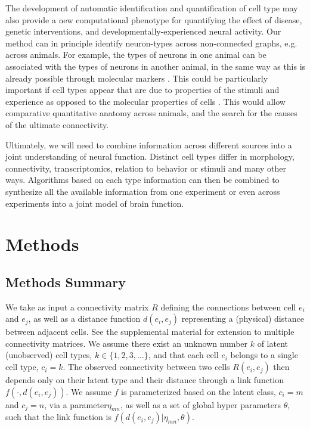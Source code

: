 \documentclass{article}
\begin{document}
The development of automatic identification and quantification of cell
type may also provide a new computational phenotype for quantifying the effect
of disease, genetic interventions, and developmentally-experienced neural activity. Our method can in principle identify neuron-types across non-connected graphs, e.g. across animals. For example, the types of neurons in one animal can be associated with the types of neurons in another animal, in the same way as this is already possible through molecular markers \autocite{}. This could be particularly important if cell types appear that are due to properties of the stimuli and experience as opposed to the molecular properties of cells \autocite{}. This would allow comparative quantitative anatomy across animals, and the search for the causes of the ultimate connectivity.

Ultimately, we will need to combine information across different
sources into a joint understanding of neural function. Distinct cell
types differ in morphology, connectivity, transcriptomics, relation to
behavior or stimuli and many other ways. Algorithms based on each type
information can then be combined to synthesize all the available
information from one experiment or even across experiments into a
joint model of brain function.

\printbibliography


\newpage
\section{Methods }
\subsection{Methods Summary}

We take as input a connectivity matrix $R$ defining the connections
between cell $e_i$ and $e_j$, as well as a distance function $d(e_i, e_j)$
representing a (physical) distance between adjacent cells. See the
supplemental material for extension to multiple connectivity
matrices. We assume there exist an unknown number $k$ of latent
(unobserved) cell types, $k \in \{1, 2, 3, \dots\}$, and that
each cell $e_i$ belongs to a single cell type, $c_i = k$. The observed
connectivity between two cells $R(e_i, e_j)$ then depends only on
their latent type and their distance through a link function $f(\cdot, d(e_i, e_j))$. We assume $f$ is parameterized based on the latent class, $c_i=m$ and $c_j=n$, via a parameter$\eta_{mn}$, as well as a set of global hyper parameters $\theta$, such that the link function is $f(d(e_i, e_j) | \eta_{mn}, \theta)$. 
\end{document}
